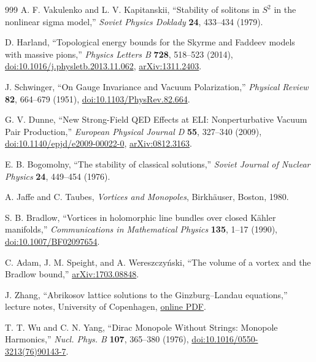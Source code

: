 \documentclass[aps,prd,reprint,nofootinbib,superscriptaddress,floatfix]{revtex4-2}
\numberwithin{equation}{section}
\theoremstyle{definition}
\theoremstyle{plain}
\begin{document}
\begin{thebibliography}{999}
A. F. Vakulenko and L. V. Kapitanskii,
``Stability of solitons in \(S^2\) in the nonlinear sigma model,''
\emph{Soviet Physics Doklady} \textbf{24}, 433--434 (1979).

D. Harland,
``Topological energy bounds for the Skyrme and Faddeev models with massive pions,''
\emph{Physics Letters B} \textbf{728}, 518--523 (2014),
\href{https://doi.org/10.1016/j.physletb.2013.11.062}{doi:10.1016/j.physletb.2013.11.062},
\href{https://arxiv.org/abs/1311.2403}{arXiv:1311.2403}.

J. Schwinger,
``On Gauge Invariance and Vacuum Polarization,''
\emph{Physical Review} \textbf{82}, 664--679 (1951),
\href{https://doi.org/10.1103/PhysRev.82.664}{doi:10.1103/PhysRev.82.664}.

G. V. Dunne,
``New Strong-Field QED Effects at ELI: Nonperturbative Vacuum Pair Production,''
\emph{European Physical Journal D} \textbf{55}, 327--340 (2009),
\href{https://doi.org/10.1140/epjd/e2009-00022-0}{doi:10.1140/epjd/e2009-00022-0},
\href{https://arxiv.org/abs/0812.3163}{arXiv:0812.3163}.




E. B. Bogomolny,
``The stability of classical solutions,''
\emph{Soviet Journal of Nuclear Physics} \textbf{24}, 449--454 (1976).

A. Jaffe and C. Taubes,
\emph{Vortices and Monopoles},
Birkhäuser, Boston, 1980.

S. B. Bradlow,
``Vortices in holomorphic line bundles over closed Kähler manifolds,''
\emph{Communications in Mathematical Physics} \textbf{135}, 1--17 (1990),
\href{https://doi.org/10.1007/BF02097654}{doi:10.1007/BF02097654}.

C. Adam, J. M. Speight, and A. Wereszczyński,
``The volume of a vortex and the Bradlow bound,''
\href{https://arxiv.org/abs/1703.08848}{arXiv:1703.08848}.

J. Zhang,
``Abrikosov lattice solutions to the Ginzburg--Landau equations,''
lecture notes, University of Copenhagen,
\href{https://jingxuan.sites.ku.dk/files/2020/06/abrikosov.pdf}{online PDF}.


T. T. Wu and C. N. Yang,
``Dirac Monopole Without Strings: Monopole Harmonics,''
\emph{Nucl. Phys. B} \textbf{107}, 365--380 (1976),
\href{https://doi.org/10.1016/0550-3213(76)90143-7}{doi:10.1016/0550-3213(76)90143-7}.


\end{thebibliography}
\end{document}
